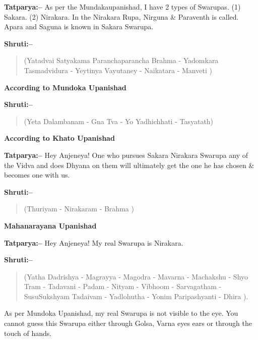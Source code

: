 \textbf{Tatparya:–} As per the Mundakaupanishad, I have 2 types of Swarupas. (1) Sakara. (2) Nirakara. In the Nirakara Rupa, Nirguna \& Paraventh is called. Apara and Saguna is known in Sakara Swarupa.

\textbf{Shruti:–}

\begin{verse}
(Yatadvai Satyakama Paranchaparancha Brahma - Yadom\break kara  Tasmadvidura - Yeytinya Vayutaney - Naikatara - Manveti )
\end{verse}

\begin{flushright}
\textbf{According to Mundoka Upanishad}
\end{flushright}

\textbf{Shruti:–}

\begin{verse}
(Yeta Dalambanam - Gna Tva - Yo Yadhichhati - Tasyatath)
\end{verse}

\begin{flushright}
\textbf{According to Khato Upanishad}
\end{flushright}

\textbf{Tatparya:–} Hey Anjeneya! One who pursues Sakara Nirakara Swarupa any of the Vidva and does Dhyana on them will ultimately get the one he has chosen \& becomes one with us.

\newpage

\textbf{Shruti:–}

\begin{verse}
(Thuriyam - Nirakaram - Brahma )
\end{verse}

\begin{flushright}
\textbf{Mahanarayana Upanishad}
\end{flushright}

\textbf{Tatparya:–} Hey Anjeneya! My real Swarupa is Nirakara.

\textbf{Shruti:–}

\begin{verse}
(Yatha Dadrishya - Magrayya - Magodra - Mavarna - Machakshu - Shyo Tram - Tadavani - Padam - Nityam - Vibhoom - Sarvagatham - SusuSukshyam Tadaivam - Yadlohutha - Yonim Paripashyanti - Dhira ).
\end{verse}

As per Mundoka Upanishad, my real Swarupa is not visible to the eye. You cannot guess this Swarupa either through Golsa, Varna eyes ears or through the touch of hands.

